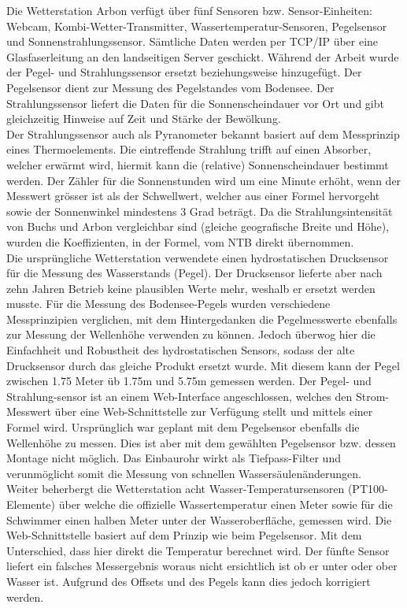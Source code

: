 \documentclass[11pt]{article}
\begin{document}
\begin{multicols}{2}
Die Wetterstation Arbon verfügt über fünf Sensoren bzw. Sensor-Einheiten: Webcam, Kombi-Wetter-Transmitter, Wassertemperatur-Sensoren, Pegelsensor und Sonnenstrahlungssensor. Sämtliche Daten werden per TCP/IP über eine Glasfaserleitung an den landseitigen Server geschickt. Während der Arbeit wurde der Pegel- und Strahlungssensor ersetzt beziehungsweise hinzugefügt. Der Pegelsensor dient zur Messung des Pegelstandes vom Bodensee. Der Strahlungssensor liefert die Daten für die Sonnenscheindauer  vor Ort und gibt gleichzeitig Hinweise auf Zeit und Stärke der Bewölkung.\\ 
Der Strahlungssensor auch als Pyranometer bekannt basiert auf dem Messprinzip eines Thermoelements. Die eintreffende Strahlung trifft auf einen Absorber, welcher erwärmt wird, hiermit kann die (relative) Sonnenscheindauer bestimmt werden. Der Zähler für die Sonnenstunden wird um eine Minute erhöht, wenn der Messwert grösser ist als der Schwellwert, welcher aus einer Formel hervorgeht sowie der Sonnenwinkel mindestens 3 Grad beträgt. Da die Strahlungsintensität von Buchs und Arbon vergleichbar sind (gleiche geografische Breite und Höhe), wurden die Koeffizienten, in der Formel, vom NTB direkt übernommen.\\
Die ursprüngliche Wetterstation verwendete einen hydrostatischen Drucksensor für die Messung des Wasserstands (Pegel). Der Drucksensor lieferte aber nach zehn Jahren Betrieb keine plausiblen Werte mehr, weshalb er ersetzt werden musste. Für die Messung des Bodensee-Pegels wurden verschiedene Messprinzipien verglichen, mit dem Hintergedanken die Pegelmesswerte ebenfalls zur Messung der Wellenhöhe verwenden zu können. Jedoch überwog hier die Einfachheit und Robustheit des hydrostatischen Sensors, sodass der alte Drucksensor durch das gleiche Produkt ersetzt wurde. Mit diesem kann der Pegel zwischen 1.75 Meter üb 1.75m und 5.75m gemessen werden. Der Pegel- und Strahlung-sensor ist an einem Web-Interface angeschlossen, welches den Strom-Messwert über eine Web-Schnittstelle zur Verfügung stellt und mittels einer Formel wird. Ursprünglich war geplant mit dem Pegelsensor ebenfalls die Wellenhöhe zu messen. Dies ist aber mit dem gewählten Pegelsensor bzw. dessen Montage nicht möglich. Das Einbaurohr wirkt als Tiefpass-Filter und verunmöglicht somit die Messung von schnellen Wassersäulenänderungen.\\ 
Weiter beherbergt die Wetterstation acht Wasser-Temperatursensoren (PT100-Elemente) über welche die offizielle Wassertemperatur einen Meter sowie für die Schwimmer einen halben Meter unter der Wasseroberfläche, gemessen wird. Die Web-Schnittstelle basiert auf dem Prinzip wie beim Pegelsensor. Mit dem Unterschied, dass hier direkt die Temperatur berechnet wird. Der fünfte Sensor liefert ein falsches Messergebnis woraus nicht ersichtlich ist ob er unter oder ober Wasser ist. Aufgrund des Offsets und des Pegels kann dies jedoch korrigiert werden.\\




\end{multicols}
\end{document}
